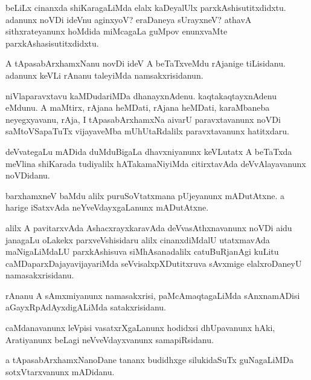 \documentclass{article}
\begin{document}
\begin{mn}%
beLiLx cinanxda shiKaragaLiMda elalx kaDeyalUlx parxkAshisutitxdidxtu. adanunx noVDi 
ideVnu aginxyoV? eraDaneya sUrayxneV? athavA sithxrateyanunx hoMdida miMcagaLa guMpov 
enunxvaMte parxkAshasisutitxdidxtu.
\end{mn}

\begin{mn}%
A tApasabArxhamxNanu novDi ideV A beTaTxveMdu rAjanige tiLisidanu. adanunx keVLi rAnanu 
taleyiMda namsakxrisidanun.
\end{mn}

\begin{mn}%
niVlaparavxtavu kaMDudariMDa dhanayxnAdenu. kaqtakaqtayxnAdenu eMdunu. A maMtirx, rAjana 
heMDati, rAjana heMDati, karaMbaneba neyegxyavanu, rAja, I tApasabArxhamxNa aivarU 
paravxtavanunx noVDi saMtoVSapaTuTx vijayaveMba mUhUtaRdalilx paravxtavanunx hatitxdaru.
\end{mn}

\begin{mn}%
deVvategaLu mADida duMduBigaLa dhavxniyanunx keVLutatx A beTaTxda meVlina shiKarada 
tudiyalilx hATakamaNiyiMda citirxtavAda deVvAlayavanunx noVDidanu.
\end{mn}

\begin{mn}%
barxhamxneV baMdu alilx puruSoVtatxmana pUjeyanunx mADutAtxne. a harige iSatxvAda 
neYveVdayxgaLanunx mADutAtxne.
\end{mn}

\begin{mn}%
alilx A pavitarxvAda AshacxrayxkaravAda deVvasAthxnavanunx noVDi aidu janagaLu oLakekx 
parxveVshisidaru alilx cinanxdiMdalU utatxmavAda maNigaLiMdaLU parxkAshisuva 
siMhAsanadalilx catuBuRjanAgi kuLitu caMDaparxDajayavijayariMda seVvisalxpXDutitxruva 
sAvxmige elalxroDaneyU namasakxrisidanu.
\end{mn}

\begin{mn}%
rAnanu A sAmxmiyanunx namasakxrisi, paMcAmaqtagaLiMda sAnxnamADisi aGayxRpAdAyxdigALiMda 
satakxrisidanu.
\end{mn}

\begin{mn}%
caMdanavanunx leVpisi vasatxrXgaLanunx hodidxsi dhUpavanunx hAki, Aratiyanunx beLagi 
neVveVdayxvanunx samapiRsidanu.
\end{mn}

\begin{mn}%
a tApasabArxhamxNanoDane tananx budidhxge silukidaSuTx guNagaLiMDa sotxVtarxvanunx mADidanu.
\end{mn}
\end{document}
